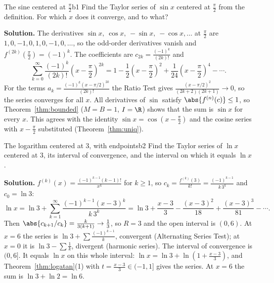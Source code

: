 \documentclass[11pt]{article}
\begin{document}
\begin{exmp}{The sine centered at $\frac\pi2$}{b1}
Find the Taylor series of $\sin x$ centered at $\frac\pi2$ from the definition. For which $x$ does it converge, and to what?

\textbf{Solution.} The derivatives $\sin x,\ \cos x,\ -\sin x,\ -\cos x,\dots$ at $\frac\pi2$ are $1,0,-1,0,1,0,-1,0,\dots$, so the odd-order derivatives vanish and $f^{(2k)}(\frac\pi2)=(-1)^k$. The coefficients are $c_{2k}=\frac{(-1)^k}{(2k)!}$ and
\[
\sum_{k=0}^\infty\frac{(-1)^k}{(2k)!}\left(x-\frac\pi2\right)^{2k}=1-\frac12\left(x-\frac\pi2\right)^2+\frac1{24}\left(x-\frac\pi2\right)^4-\cdots .
\]
For the terms $a_k=\frac{(-1)^k(x-\pi/2)^{2k}}{(2k)!}$ the Ratio Test gives $\frac{(x-\pi/2)^2}{(2k+2)(2k+1)}\to0$, so the series converges for all $x$. All derivatives of $\sin$ satisfy $\abs{f^{(n)}(c)}\le1$, so Theorem~\ref{thm:bounded} ($M=B=1$, $I=\R$) shows that the sum is $\sin x$ for every $x$. This agrees with the identity $\sin x=\cos\left(x-\frac\pi2\right)$ and the cosine series with $x-\frac\pi2$ substituted (Theorem~\ref{thm:uniq}).
\end{exmp}

\begin{exmp}{The logarithm centered at $3$, with endpoints}{b2}
Find the Taylor series of $\ln x$ centered at $3$, its interval of convergence, and the interval on which it equals $\ln x$.

\textbf{Solution.} $f^{(k)}(x)=\frac{(-1)^{k-1}(k-1)!}{x^k}$ for $k\ge1$, so $c_k=\frac{f^{(k)}(3)}{k!}=\frac{(-1)^{k-1}}{k\,3^k}$ and $c_0=\ln3$:
\[
\ln x=\ln3+\sum_{k=1}^\infty\frac{(-1)^{k-1}(x-3)^k}{k\,3^k}=\ln3+\frac{x-3}3-\frac{(x-3)^2}{18}+\frac{(x-3)^3}{81}-\cdots .
\]
Then $\abs{c_{k+1}/c_k}=\frac k{3(k+1)}\to\frac13$, so $R=3$ and the open interval is $(0,6)$. At $x=6$ the series is $\ln3+\sum\frac{(-1)^{k-1}}k$, convergent (Alternating Series Test); at $x=0$ it is $\ln3-\sum\frac1k$, divergent (harmonic series). The interval of convergence is $(0,6]$. It equals $\ln x$ on this whole interval: $\ln x=\ln3+\ln\left(1+\frac{x-3}3\right)$, and Theorem~\ref{thm:logatan}(1) with $t=\frac{x-3}3\in(-1,1]$ gives the series. At $x=6$ the sum is $\ln3+\ln2=\ln6$.
\end{exmp}
\end{document}
